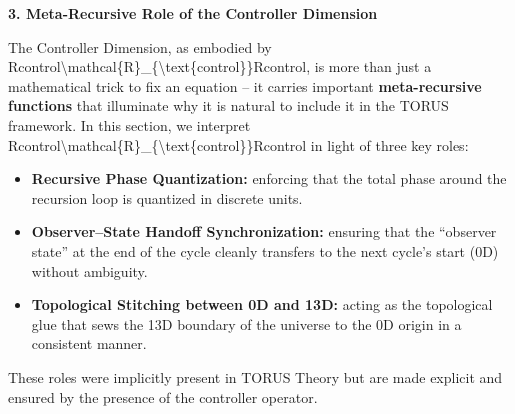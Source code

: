 \documentclass[
]{article}
\begin{document}
\textbf{3. Meta-Recursive Role of the Controller Dimension}

The Controller Dimension, as embodied by
Rcontrol\textbackslash mathcal\{R\}\_\{\textbackslash text\{control\}\}Rcontrol\hspace{0pt},
is more than just a mathematical trick to fix an equation -- it carries
important \textbf{meta-recursive functions} that illuminate why it is
natural to include it in the TORUS framework. In this section, we
interpret
Rcontrol\textbackslash mathcal\{R\}\_\{\textbackslash text\{control\}\}Rcontrol\hspace{0pt}
in light of three key roles:

\begin{itemize}
\item
  \textbf{Recursive Phase Quantization:} enforcing that the total phase
  around the recursion loop is quantized in discrete units.
\item
  \textbf{Observer--State Handoff Synchronization:} ensuring that the
  ``observer state'' at the end of the cycle cleanly transfers to the
  next cycle's start (0D) without ambiguity.
\item
  \textbf{Topological Stitching between 0D and 13D:} acting as the
  topological glue that sews the 13D boundary of the universe to the 0D
  origin in a consistent manner.
\end{itemize}

These roles were implicitly present in TORUS Theory but are made
explicit and ensured by the presence of the controller operator.
\end{document}

